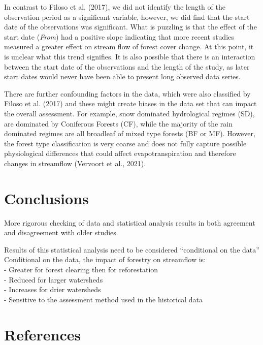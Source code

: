 \documentclass[]{elsarticle} %
\begin{document}
In contrast to Filoso et al. (2017), we did not identify the length of the observation period as a significant variable, however, we did find that the start date of the observations was significant. What is puzzling is that the effect of the start date (\emph{From}) had a positive slope indicating that more recent studies measured a greater effect on stream flow of forest cover change. At this point, it is unclear what this trend signifies. It is also possible that there is an interaction between the start date of the observations and the length of the study, as later start dates would never have been able to present long observed data series.

There are further confounding factors in the data, which were also classified by Filoso et al. (2017) and these might create biases in the data set that can impact the overall assessment. For example, snow dominated hydrological regimes (SD), are dominated by Coniferous Forests (CF), while the majority of the rain dominated regimes are all broadleaf of mixed type forests (BF or MF). However, the forest type classification is very coarse and does not fully capture possible physiological differences that could affect evapotranspiration and therefore changes in streamflow (Vervoort et al., 2021).

\hypertarget{conclusions}{%
\section{Conclusions}\label{conclusions}}

More rigorous checking of data and statistical analysis results in both agreement and disagreement with older studies.

Results of this statistical analysis need to be considered ``conditional on the data''
Conditional on the data, the impact of forestry on streamflow is:\\
- Greater for forest clearing then for reforestation\\
- Reduced for larger watersheds\\
- Increases for drier watersheds\\
- Sensitive to the assessment method used in the historical data

\hypertarget{references}{%
\section*{References}\label{references}}
\end{document}
